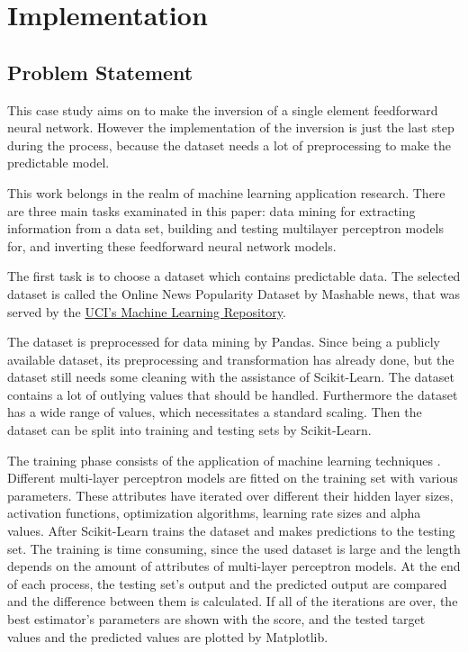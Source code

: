 \chapter{Implementation}

\section{Problem Statement}

This case study aims on to make the inversion of a single element feedforward neural network. However the implementation of the inversion is just the last step during the process, because the dataset needs a lot of preprocessing to make the predictable model.\smallskip

This work belongs in the realm of machine learning application research. There are three main tasks examinated in this paper: data mining for extracting information from a data set, building and testing multilayer perceptron models for, and inverting these feedforward neural network models. \medskip

The first task is to choose a dataset which contains predictable data. The selected dataset is called the Online News Popularity Dataset by Mashable news, that was served by the  \href{http://archive.ics.uci.edu/ml/datasets/Online+News+Popularity}{UCI's Machine Learning Repository}. \smallskip

The dataset is preprocessed for data mining by Pandas. Since being a publicly available dataset, its preprocessing and transformation has already done, but the dataset still needs some cleaning with the assistance of Scikit-Learn. The dataset contains a lot of outlying values that should be handled. Furthermore the dataset has a wide range of values, which necessitates a standard scaling. Then the dataset can be split into training and testing sets by Scikit-Learn. \medskip

The training phase consists of the application of machine learning techniques \cite{karayiannis2013artificial}. Different multi-layer perceptron models are fitted on the training set with various parameters. These attributes have iterated over different their hidden layer sizes, activation functions, optimization algorithms, learning rate sizes and alpha values. After Scikit-Learn trains the dataset and makes predictions to the testing set. The training is time consuming, since the used dataset is large and the length depends on the amount of attributes of multi-layer perceptron models. At the end of each process, the testing set's output and the predicted output are compared and the difference between them is calculated. If all of the iterations are over, the best estimator's parameters are shown with the score, and the tested target values and the predicted values are plotted by Matplotlib.\medskip

